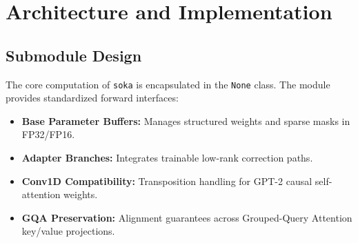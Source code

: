 \section{Architecture and Implementation}

\subsection{Submodule Design}
The core computation of \texttt{soka} is encapsulated in the \texttt{None} class. The module provides standardized forward interfaces:
\begin{itemize}
\item \textbf{Base Parameter Buffers:} Manages structured weights and sparse masks in FP32/FP16.
\item \textbf{Adapter Branches:} Integrates trainable low-rank correction paths.
\item \textbf{Conv1D Compatibility:} Transposition handling for GPT-2 causal self-attention weights.
\item \textbf{GQA Preservation:} Alignment guarantees across Grouped-Query Attention key/value projections.
\end{itemize}
